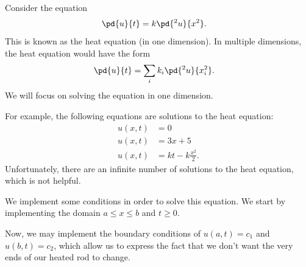 \documentclass[10pt]{mypackage}
\begin{document}
\begin{example}
  Consider the equation
    \begin{align*}
      \pd{u}{t} &= k \pd{^2u}{x^2}.
    \end{align*}
    This is known as the heat equation (in one dimension). In multiple dimensions, the heat equation would have the form
    \begin{align*}
      \pd{u}{t} &= \sum_{i} k_i\pd{^2u}{x_i^2}.
    \end{align*}
    We will focus on solving the equation in one dimension.\newline

    For example, the following equations are solutions to the heat equation:
    \begin{align*}
      u\left( x,t \right) &= 0\\
      u\left( x,t \right) &= 3x + 5\\
      u\left( x,t \right) &= kt - k\frac{x^2}{2}.
    \end{align*}
    Unfortunately, there are an infinite number of solutions to the heat equation, which is not helpful.\newline

    We implement some conditions in order to solve this equation. We start by implementing the domain $a\leq x \leq b$ and $t\geq 0$.\newline

    Now, we may implement the boundary conditions of $u\left( a,t \right) = c_1$ and $u\left( b,t \right) = c_2$, which allow us to express the fact that we don't want the very ends of our heated rod to change.
\end{example}
\end{document}
